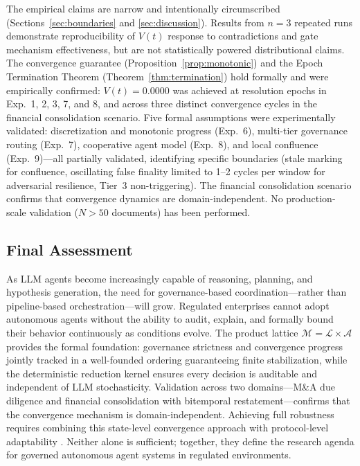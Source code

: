 \documentclass[11pt]{article}
\begin{document}
The empirical claims are narrow and intentionally circumscribed (Sections~\ref{sec:boundaries} and \ref{sec:discussion}). Results from $n = 3$ repeated runs demonstrate reproducibility of $V(t)$ response to contradictions and gate mechanism effectiveness, but are not statistically powered distributional claims. The convergence guarantee (Proposition~\ref{prop:monotonic}) and the Epoch Termination Theorem (Theorem~\ref{thm:termination}) hold formally and were empirically confirmed: $V(t) = 0.0000$ was achieved at resolution epochs in Exp.~1, 2, 3, 7, and 8, and across three distinct convergence cycles in the financial consolidation scenario. Five formal assumptions were experimentally validated: discretization and monotonic progress (Exp.~6), multi-tier governance routing (Exp.~7), cooperative agent model (Exp.~8), and local confluence (Exp.~9)---all partially validated, identifying specific boundaries (stale marking for confluence, oscillating false finality limited to 1--2 cycles per window for adversarial resilience, Tier~3 non-triggering). The financial consolidation scenario confirms that convergence dynamics are domain-independent. No production-scale validation ($N > 50$ documents) has been performed.

\subsection{Final Assessment}

As LLM agents become increasingly capable of reasoning, planning, and hypothesis generation, the need for governance-based coordination---rather than pipeline-based orchestration---will grow. Regulated enterprises cannot adopt autonomous agents without the ability to audit, explain, and formally bound their behavior continuously as conditions evolve. The product lattice $\mathcal{M} = \mathcal{L} \times \mathcal{A}$ provides the formal foundation: governance strictness and convergence progress jointly tracked in a well-founded ordering guaranteeing finite stabilization, while the deterministic reduction kernel ensures every decision is auditable and independent of LLM stochasticity. Validation across two domains---M\&A due diligence and financial consolidation with bitemporal restatement---confirms that the convergence mechanism is domain-independent. Achieving full robustness requires combining this state-level convergence approach with protocol-level adaptability \cite{delachica2026}. Neither alone is sufficient; together, they define the research agenda for governed autonomous agent systems in regulated environments.
\end{document}
